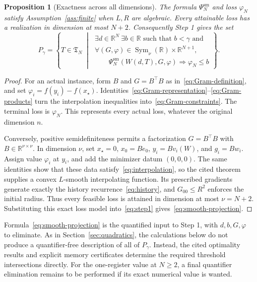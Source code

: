\documentclass[11pt]{article}
\numberwithin{equation}{section}
\newtheorem{proposition}[theorem]{Proposition}
\theoremstyle{definition}
\newcommand{\R}{\mathbb R}
\DeclareMathOperator{\Sym}{Sym}
\begin{document}
\begin{proposition}[Exactness across all dimensions]\label{prop:smooth-model}
The formula $\Psi_N^{\mathrm{sm}}$ and loss $\varphi_N$ satisfy Assumption~\ref{ass:finite} when $L,R$ are algebraic. Every attainable loss has a realization in dimension at most $N+2$. Consequently Step 1 gives the set
\begin{equation}
 P_\gamma=\left\{T\in\mathfrak T_N\;\middle|\;
 \begin{array}{l}
 \exists d\in\R^N\ \exists b\in\R\text{ such that }b<\gamma\text{ and}\\[2pt]
 \forall(G,\varphi)\in\Sym_\nu(\R)\times\R^{N+1},\\[2pt]
 \qquad\Psi_N^{\mathrm{sm}}(W(d,T),G,\varphi)\Rightarrow\varphi_N\le b
 \end{array}
 \right\}.
 \label{eq:smooth-projection}
\end{equation}
\end{proposition}
\begin{proof}
For an actual instance, form $B$ and $G=B^\top B$ as in~\eqref{eq:Gram-definition}, and set $\varphi_i=f(y_i)-f(x_\star)$. Identities~\eqref{eq:Gram-representation}--\eqref{eq:Gram-products} turn the interpolation inequalities into~\eqref{eq:Gram-constraints}. The terminal loss is $\varphi_N$. This represents every actual loss, whatever the original dimension $n$.

Conversely, positive semidefiniteness permits a factorization $G=B^\top B$ with $B\in\R^{\nu\times\nu}$. In dimension $\nu$, set $x_\star=0$, $x_0=Be_0$, $y_i=Bv_i(W)$, and $g_i=Bw_i$. Assign value $\varphi_i$ at $y_i$, and add the minimizer datum $(0,0,0)$. The same identities show that these data satisfy~\eqref{eq:interpolation}, so the cited theorem supplies a convex $L$-smooth interpolating function. Its prescribed gradients generate exactly the history recurrence~\eqref{eq:history}, and $G_{00}\le R^2$ enforces the initial radius. Thus every feasible loss is attained in dimension at most $\nu=N+2$. Substituting this exact loss model into~\eqref{eq:step1} gives~\eqref{eq:smooth-projection}.
\end{proof}

Formula~\eqref{eq:smooth-projection} is the quantified input to Step 1, with $d,b,G,\varphi$ to eliminate. As in Section~\ref{sec:quadratics}, the calculations below do not produce a quantifier-free description of all of $P_\gamma$. Instead, the cited optimality results and explicit memory certificates determine the required threshold intersections directly. For the one-register value at $N\ge2$, a final quantifier elimination remains to be performed if its exact numerical value is wanted.
\end{document}
